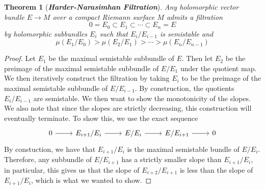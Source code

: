 \documentclass[psamsfonts, 12pt]{amsart}
\newtheorem{thm}{Theorem}[section]
\theoremstyle{definition}
\theoremstyle{remark}
\newcommand{\ib}[1]{\textbf{\textit{#1}}}
\begin{document}
%
\begin{thm}[\ib{Harder-Narasimhan Filtration}]
Any holomorphic vector bundle $E \to M$ over a compact Riemann surface $M$ admits
a filtration
\[
0 = E_0 \subset E_1 \subset \cdots \subset E_n = E
\]
by holomorphic subbundles $E_i$ such that $E_i/E_{i-1}$ is semistable and
\[
\mu(E_1/E_0) > \mu(E_2/E_1) > \cdots > \mu(E_n/E_{n-1})
\]
\end{thm}
%
\begin{proof}
Let $E_1$ be the maximal semistable subbundle of $E$. Then let $E_2$ be
the preimage of the maximal semistable subbundle of $E/E_1$ under the quotient
map. We then iteratively construct the filtration by taking $E_i$ to be the
preimage of the maximal semistable subbundle of $E/E_{i-1}$. By construction,
the quotients $E_i/E_{i-1}$ are semistable. We then want to show the monotonicity
of the slopes. We also note that since the slopes are strictly decreasing,
this construction will eventually terminate. To show this, we use the exact sequence
\[\begin{tikzcd}
0 \ar[r] & E_{i+1}/E_i \ar[r] & E/E_i \ar[r] & E/E_{i+1} \ar[r] & 0
\end{tikzcd}\]
By constuction, we have that $E_{i+1}/E_i$ is the maximal semistable bundle of
$E/E_i$. Therefore, any subbundle of $E/E_{i+1}$ has a strictly smaller slope than
$E_{i+1}/E_i$, in particular, this gives us that the slope of $E_{i+2}/E_{i+1}$
is less than the slope of $E_{i+1}/E_i$, which is what we wanted to show.
\end{proof}
%
\newpage
%
\nocite{*}
%
\printbibliography
%
\end{document}
